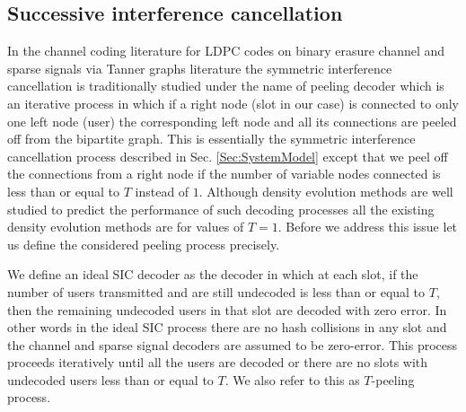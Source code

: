 \subsection{Successive interference cancellation}
\label{sec:SICanalysis}
In the channel coding literature for LDPC codes on binary erasure channel and sparse signals via Tanner graphs literature the symmetric interference cancellation is traditionally studied under the name of peeling decoder which is an iterative process in which if a right node (slot in our case) is connected to only one left node (user) the corresponding left node and all its connections are peeled off from the bipartite graph. This is essentially the symmetric interference cancellation process described in Sec. \ref{Sec:SystemModel} except that we peel off the connections from a right node if the number of variable nodes connected is less than or equal to $T$ instead of $1$. Although density evolution methods are well studied to predict the performance of such decoding processes all the existing density evolution methods are for values of $T=1$. Before we address this issue let us define the considered peeling process precisely.
\begin{definition}[$T$-peeling]
\label{def:T-peeling_process}
We define an ideal SIC decoder as the decoder in which at each slot, if the number of users transmitted and are still undecoded is less than or equal to $T$, then the remaining undecoded users in that slot are decoded with zero error. In other words in the ideal SIC process there are no hash collisions in any slot and the channel and sparse signal decoders are assumed to be zero-error. This process proceeds iteratively until all the users are decoded or there are no slots with undecoded users less than or equal to $T$. We also refer to this as $T$-peeling process.
\end{definition}

